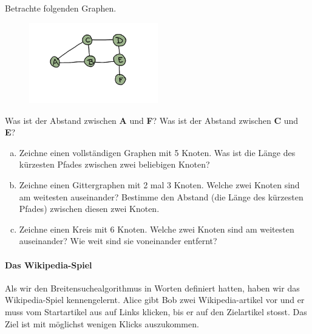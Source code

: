 \begin{aufgabe}\label{aufgabe_abstand_ex}
Betrachte folgenden Graphen.
\begin{figure}[H]
    \centering
    \includegraphics[width=0.5\textwidth]{Pictures/SP/abstand_ex.png} 
    \label{fig:abstand_ex}
\end{figure}
Was ist der Abstand zwischen \textbf{A} und \textbf{F}?
Was ist der Abstand zwischen \textbf{C} und \textbf{E}?
\end{aufgabe}
\begin{aufgabe}\label{aufgabe_abstand}
\begin{enumerate}[(a)]
\item \label{aufgabe_abstand_k5} Zeichne einen vollständigen Graphen mit 5 Knoten. Was ist die Länge des kürzesten Pfades zwischen zwei beliebigen Knoten?
\item \label{aufgabe_abstand_gitter23} Zeichne einen Gittergraphen mit 2 mal 3 Knoten. Welche zwei Knoten sind am weitesten auseinander? Bestimme den Abstand (die Länge des kürzesten Pfades) zwischen diesen zwei Knoten.
\item \label{aufgabe_abstand_kreis6} Zeichne einen Kreis mit 6 Knoten. Welche zwei Knoten sind am weitesten auseinander? Wie weit sind sie voneinander entfernt?
\end{enumerate}
\end{aufgabe}

\paragraph{Das Wikipedia-Spiel}
Als wir den Breitensuchealgorithmus in Worten definiert hatten, haben wir das Wikipedia-Spiel kennengelernt. Alice gibt Bob zwei Wikipedia-artikel vor und er muss vom Startartikel aus auf Links klicken, bis er auf den Zielartikel stosst. Das Ziel ist mit möglichst wenigen Klicks auszukommen. 

